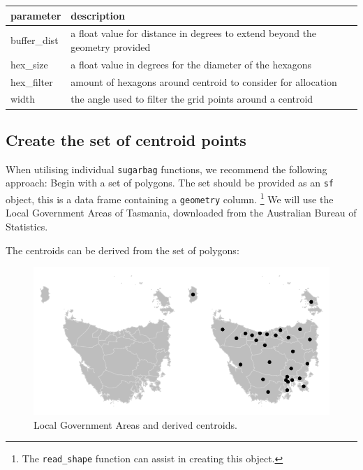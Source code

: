\begin{Schunk}

\begin{tabular}{l|l}
\hline
parameter & description\\
\hline
buffer\_dist & a float value for distance in degrees to extend beyond the geometry provided\\
\hline
hex\_size & a float value in degrees for the diameter of the hexagons\\
\hline
hex\_filter & amount of hexagons around centroid to consider for allocation\\
\hline
width & the angle used to filter the grid points around a centroid\\
\hline
\end{tabular}

\end{Schunk}

\hypertarget{create-the-set-of-centroid-points}{%
\subsection{Create the set of centroid
points}\label{create-the-set-of-centroid-points}}

When utilising individual \texttt{sugarbag} functions, we recommend the
following approach: Begin with a set of polygons. The set should be
provided as an \texttt{sf} object, this is a data frame containing a
\texttt{geometry} column. \footnote{The \texttt{read\_shape} function
  can assist in creating this object.} We will use the Local Government
Areas of Tasmania, downloaded from the Australian Bureau of Statistics.

The centroids can be derived from the set of polygons:

\begin{Schunk}
\begin{figure}
\includegraphics{algorithmRjournal_files/figure-latex/end_cents-1} \caption[Local Government Areas and derived centroids]{Local Government Areas and derived centroids.}\label{fig:end_cents}
\end{figure}
\end{Schunk}

